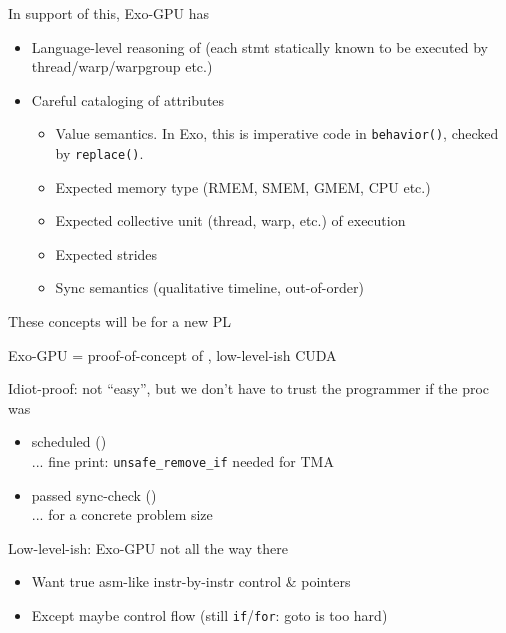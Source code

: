\newpage
{}

{\LARGE
In support of this, Exo-GPU has
\begin{itemize}
  \item Language-level reasoning of 
  (each stmt statically known to be executed by thread/warp/warpgroup etc.)
  \item Careful cataloging of  attributes
  \begin{itemize}
    \item Value semantics. In Exo, this is imperative code in \texttt{behavior()}, checked by \texttt{replace()}.
    \item Expected memory type (RMEM, SMEM, GMEM, CPU etc.)
    \item Expected collective unit (thread, warp, etc.) of execution
    \item Expected strides
    \item Sync semantics (qualitative timeline, out-of-order)
  \end{itemize}
\end{itemize}
These concepts will be  for a new PL

}

\newpage
{}

{\LARGE
Exo-GPU = proof-of-concept of , low-level-ish CUDA

\vfill

Idiot-proof: not ``easy'', but we don't have to trust the programmer if the proc was
\begin{itemize}
  \item scheduled ()\\
    ... fine print: \texttt{unsafe\_remove\_if} needed for TMA
  \item passed sync-check ()\\
    ... for a concrete problem size
\end{itemize}

\vfill

Low-level-ish: Exo-GPU not all the way there
\begin{itemize}
  \item Want true asm-like instr-by-instr control \& pointers
  \item Except maybe control flow (still \texttt{if}/\texttt{for}: goto is too hard)
\end{itemize}

\vfill

}

